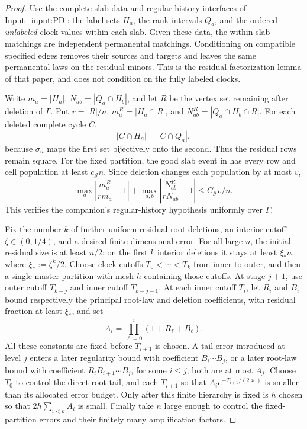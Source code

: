 \documentclass[11pt]{article}
\numberwithin{equation}{section}
\theoremstyle{definition}
\theoremstyle{remark}
\begin{document}
\begin{proof}
Use the complete slab data and regular-history interfaces of
Input~\ref{input:PD}: the label sets $H_a$,
the rank intervals $Q_a$, and the ordered \emph{unlabeled} clock values
within each slab.  Given these data, the within-slab matchings are
independent permanental matchings.  Conditioning on compatible specified
edges removes their sources and targets and leaves the same permanental
laws on the residual minors.  This is the residual-factorization lemma of
that paper, and does not condition on the fully labeled clocks.

Write $m_a=|H_a|$, $N_{ab}=|Q_a\cap H_b|$, and let $R$ be the vertex set
remaining after deletion of $\Gamma$.  Put $r=|R|/n$,
$m_a^R=|H_a\cap R|$, and $N_{ab}^R=|Q_a\cap H_b\cap R|$.
For each deleted complete cycle $C$,
\[
 |C\cap H_a|=|C\cap Q_a|,
\]
because $\sigma_n$ maps the first set bijectively onto the second.
Thus the residual rows remain square.  For the fixed partition, the good
slab event in \cite{LongPD2026} has every row and cell population at least
$c_{\mathcal J}n$.  Since deletion changes each population by at most $v$,
\begin{equation}\label{eq:finite-deletion-regularity}
 \max_a\left|\frac{m_a^R}{r m_a}-1\right|
 +\max_{a,b}\left|\frac{N_{ab}^R}{r N_{ab}}-1\right|
 \le C_{\mathcal J}v/n.
\end{equation}
This verifies the companion's regular-history hypothesis uniformly over
$\Gamma$.

Fix the number $k$ of further uniform residual-root deletions, an interior
cutoff $\zeta\in(0,1/4)$, and a desired finite-dimensional error.
For all large $n$, the initial residual size is at least $n/2$; on the
first $k$ interior deletions it stays at least
$\xi_*n$, where $\xi_*:=\zeta^k/2$.
Choose clock cutoffs $T_0<\cdots<T_k$ from inner to outer, and then a
single master partition with mesh $h$ containing those cutoffs.
At stage $j+1$, use outer cutoff $T_{k-j}$ and inner cutoff $T_{k-j-1}$.
At each inner cutoff $T_i$, let $R_i$ and $B_i$ bound respectively the
principal root-law and deletion coefficients, with residual fraction at
least $\xi_*$, and set
\[
 A_i=\prod_{\ell=0}^i(1+R_\ell+B_\ell).
\]
All these constants are fixed before $T_{i+1}$ is chosen.  A tail error
introduced at level $j$ enters a later regularity bound with coefficient
$B_i\cdots B_j$, or a later root-law bound with coefficient
$R_iB_{i+1}\cdots B_j$, for some $i\le j$; both are at most $A_j$.
Choose $T_0$ to control the direct root tail, and each $T_{i+1}$ so that
$A_i e^{-T_{i+1}/(2\varkappa)}$ is smaller than its allocated error budget.
Only after this finite hierarchy is fixed is $h$ chosen so that
$2h\sum_{i<k}A_i$ is small.  Finally take $n$ large enough to control the
fixed-partition errors and their finitely many amplification factors.


\end{proof}
\end{document}
